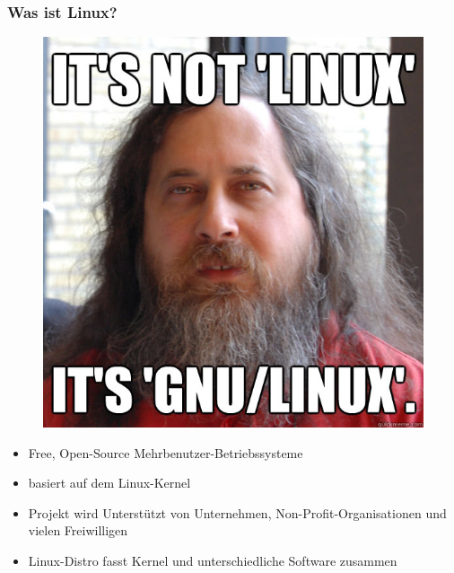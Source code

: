 \begin{frame}
\frametitle{Was ist Linux?}
\begin{figure}
\includegraphics[scale=0.17]{resources/linux.jpg}
\end{figure}
\begin{itemize}
	\item Free, Open-Source Mehrbenutzer-Betriebssysteme
	\item basiert auf dem Linux-Kernel
	\item Projekt wird Unterstützt von Unternehmen, Non-Profit-Organisationen und vielen Freiwilligen
	\item Linux-Distro fasst Kernel und unterschiedliche Software zusammen
\end{itemize}
\end{frame}

